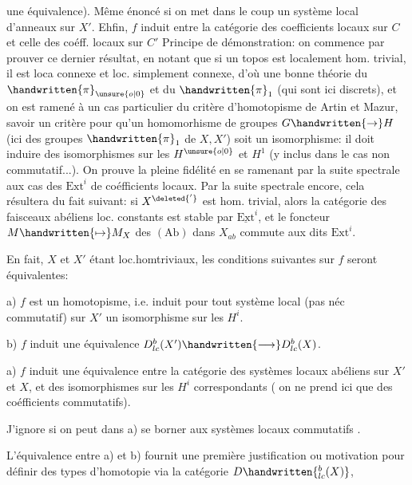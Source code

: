 
 une équivalence). Même énoncé si on met dans le coup un  système local d'anneaux sur $X'$. Ehfin, $f$ induit   entre la catégorie des coefficients locaux sur $C$ et celle des coéff. locaux sur $C'$  Principe de démonstration: on commence par prouver ce dernier résultat, en notant que  si un topos est localement hom. trivial, il est loca connexe et loc. simplement connexe, d'où une bonne théorie du $\handwritten{\pi}_{\unsure{o|0}}$ et du $\handwritten{\pi}_1$ (qui sont ici discrets), et on est ramené  à un cas particulier du critère d'homotopisme de Artin et Mazur, savoir un critère  pour qu'un homomorhisme de groupes $G\handwritten{\to}H$ (ici des groupes $\handwritten{\pi}_1$ de $X,X'$) soit un isomorphisme: il doit induire des isomorphismes sur les $H^{\unsure{o|0}}$ et $H^1$ (y inclus dans le cas non commutatif...). On prouve la pleine fidélité en se ramenant par la suite spectrale aux cas des $\mathrm{Ext}^i$ de coéfficients locaux. Par la suite spectrale encore, cela résultera du fait suivant: si $X^{\deleted{'}}$ est  hom. trivial, alors la catégorie des faisceaux abéliens loc. constants est stable par $\underline{\mathrm{Ext}}^i$, et le foncteur $M\handwritten{\mapsto}M_X$ des  $(\mathrm{Ab})$ dans $X_{ab}$ commute aux dits $\mathrm{Ext}^i$.

En fait, $X$ et $X'$ étant loc.homtriviaux, les conditions suivantes sur $f$ seront équivalentes:

a) $f$ est un homotopisme, i.e. induit pour tout système local (pas néc commutatif) sur $X'$ un isomorphisme sur les $H^i$.

b)  $f$ induit une équivalence $D^b_{lc}(X')\handwritten{\longrightarrow}D^b_{lc}(X)$.

a) $f$ induit une équivalence entre la catégorie des systèmes locaux abéliens sur $X'$ et $X$, et des isomorphismes sur les $H^i$ correspondants ( on ne prend ici que des coéfficients commutatifs).

 J'ignore si on peut dans a) se borner aux systèmes locaux commutatifs .

L'équivalence entre a) et b) fournit une première justification ou motivation pour définir des types d'homotopie via la catégorie $D\handwritten{^{b}_{lc}(X)}$,

